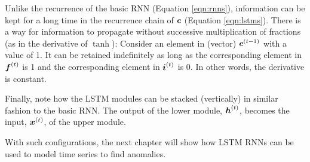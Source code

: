 
Unlike the recurrence of the basic RNN (Equation \ref{eqn:rnns}), information can be kept for a long time in the recurrence chain of $\boldsymbol{c}$ (Equation \ref{eqn:lstms}). 
%
There is a way for information to propagate without successive multiplication of fractions (as in the derivative of $\tanh$):
%
Consider an element in (vector) $\boldsymbol{c}\sp{(t-1)}$ with a value of 1.
%
It can be retained indefinitely as long as the corresponding element in $\boldsymbol{f}\sp{(t)}$ is 1 and the corresponding element in $\boldsymbol{i}\sp{(t)}$ is 0.
%
In other words, the derivative is constant.

Finally, note how the LSTM modules can be stacked (vertically) in similar fashion to the basic RNN.
%
The output of the lower module, $\boldsymbol{h}\sp{(t)}$, becomes the input, $\boldsymbol{x}\sp{(t)}$, of the upper module.


With such configurations, the next chapter will show how LSTM RNNs can be used to model time series to find anomalies.




